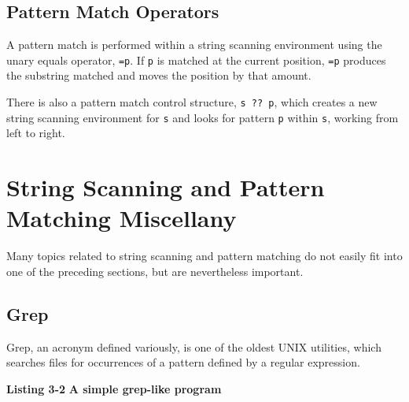 \subsection{Pattern Match Operators}

A pattern match is performed within a string scanning environment
using the unary equals operator, \texttt{=p}.  If \texttt{p}
is matched at the current position, \texttt{=p} produces the
substring matched and moves the position by that amount.

There is also a pattern match control structure, \texttt{s ?? p}, which creates
a new string scanning environment for \texttt{s} and looks for pattern
\texttt{p} within \texttt{s}, working from left to right.


\section{String Scanning and Pattern Matching Miscellany}

Many topics related to string scanning and pattern matching do not
easily fit into one of the preceding sections, but are nevertheless
important.

\subsection{Grep}

Grep, an acronym defined variously, is one of the oldest UNIX
utilities, which searches files for occurrences of a pattern defined
by a regular expression.

\bigskip

{\sffamily\bfseries Listing 3-2}
{\sffamily\bfseries A simple grep-like program}


